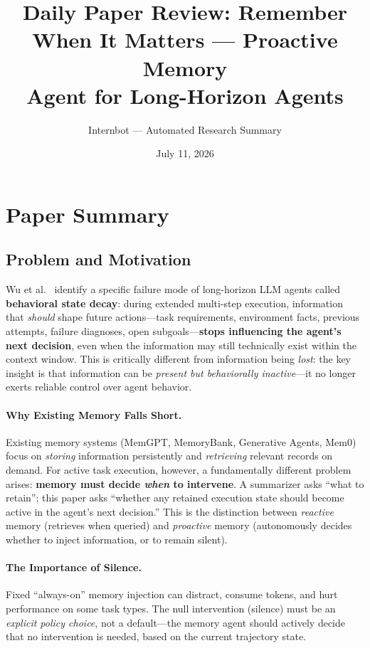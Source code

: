 \documentclass[11pt,a4paper]{article}
\title{Daily Paper Review: Remember When It Matters --- Proactive Memory\\Agent for Long-Horizon Agents}
\author{Internbot --- Automated Research Summary}
\date{July 11, 2026}
\begin{document}
\maketitle

\section{Paper Summary}

\subsection{Problem and Motivation}

Wu et al.~\cite{wu2026proactive} identify a specific failure mode of long-horizon LLM agents called \textbf{behavioral state decay}: during extended multi-step execution, information that \emph{should} shape future actions---task requirements, environment facts, previous attempts, failure diagnoses, open subgoals---\textbf{stops influencing the agent's next decision}, even when the information may still technically exist within the context window. This is critically different from information being \emph{lost}: the key insight is that information can be \emph{present but behaviorally inactive}---it no longer exerts reliable control over agent behavior.

\paragraph{Why Existing Memory Falls Short.} Existing memory systems (MemGPT, MemoryBank, Generative Agents, Mem0) focus on \emph{storing} information persistently and \emph{retrieving} relevant records on demand. For active task execution, however, a fundamentally different problem arises: \textbf{memory must decide \emph{when} to intervene}. A summarizer asks ``what to retain''; this paper asks ``whether any retained execution state should become active in the agent's next decision.'' This is the distinction between \emph{reactive} memory (retrieves when queried) and \emph{proactive} memory (autonomously decides whether to inject information, or to remain silent).

\paragraph{The Importance of Silence.} Fixed ``always-on'' memory injection can distract, consume tokens, and hurt performance on some task types. The null intervention (silence) must be an \emph{explicit policy choice}, not a default---the memory agent should actively decide that no intervention is needed, based on the current trajectory state.
\end{document}
